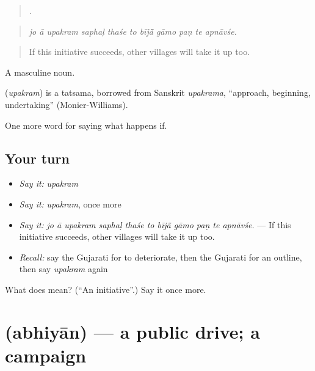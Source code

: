 \begin{quote}
          .
\end{quote}

\begin{quote}
\emph{jo ā upakram saphaḷ thaśe to bījā̃ gāmo paṇ te apnāvśe.}
\end{quote}

\begin{quote}
If this initiative succeeds, other villages will take it up too.
\end{quote}

A masculine noun.

\begin{cousinweb}
\textbf{} (\emph{upakram}) is a tatsama, borrowed from Sanskrit \emph{upakrama}, \textquotedblleft{}approach, beginning, undertaking\textquotedblright{} (Monier-Williams).
\end{cousinweb}

\begin{grammarlens}[title={What you've built}]
One more word for saying what happens if.
\end{grammarlens}

\subsection*{Your turn}
\begin{itemize}
\raggedright
  \item \emph{Say it:} \emph{upakram}
  \item \emph{Say it:} \emph{upakram}, once more
  \item \emph{Say it:} \emph{jo ā upakram saphaḷ thaśe to bījā̃ gāmo paṇ te apnāvśe.} — If this initiative succeeds, other villages will take it up too.
  \item \emph{Recall:} say the Gujarati for to deteriorate, then the Gujarati for an outline, then say \emph{upakram} again
\end{itemize}

\begin{tcolorbox}[breakable,colback=teal!4,colframe=teal!35!black,title={Before you move on}]
What does  mean? (\textquotedblleft{}An initiative\textquotedblright{}.) Say it once more.
\end{tcolorbox}
\section[\texorpdfstring{\gu{અભિયાન} (abhiyān)}{અભિયાન (abhiyān)}]{ (abhiyān) — a public drive; a campaign}

